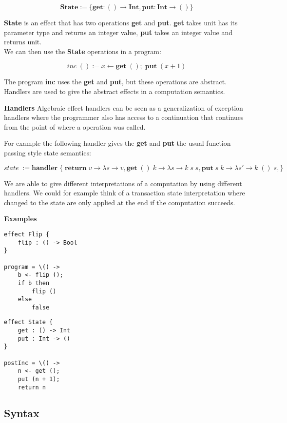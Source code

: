 {\[ \textbf{State} := \{ \textbf{get} : () \rightarrow \textbf{Int}, \textbf{put} : \textbf{Int} \rightarrow () \} \]

\textbf{State} is an effect that has two operations \textbf{get} and \textbf{put}. \textbf{get} takes unit has its parameter type and returns an integer value, \textbf{put} takes an integer value and returns unit.
\\
We can then use the \textbf{State} operations in a program:

\[ \textit{inc} \; () := x \leftarrow \textbf{get} \; () ;\; \textbf{put} \; (x + 1) \]

The program \textbf{inc} uses the \textbf{get} and \textbf{put}, but these operations are abstract.
Handlers are used to give the abstract effects in a computation semantics.

\textbf{Handlers}
Algebraic effect handlers can be seen as a generalization of exception handlers where the programmer also has access
to a continuation that continues from the point of where a operation was called.

For example the following handler gives the \textbf{get} and \textbf{put} the usual function-passing style state semantics:

\[ \textit{state} \; := \textbf{handler} \; \{ \;
  \textbf{return} \; v \rightarrow \lambda s \rightarrow v,
  \textbf{get} \; () \; k \rightarrow \lambda s \rightarrow k \; s \; s,
  \textbf{put} \; s \; k \rightarrow \lambda s' \rightarrow k \; () \; s,
\} \]

We are able to give different interpretations of a computation by using different handlers.
We could for example think of a transaction state interpretation where changed to the state are only applied at the end if the computation succeeds.

\textbf{Examples}
\begin{verbatim}
effect Flip {
	flip : () -> Bool
}

program = \() ->
	b <- flip ();
	if b then
		flip ()
	else
		false
\end{verbatim}

\begin{verbatim}
effect State {
	get : () -> Int
	put : Int -> ()
}

postInc = \() ->
	n <- get ();
	put (n + 1);
	return n
\end{verbatim}

\subsection{Syntax}

}
